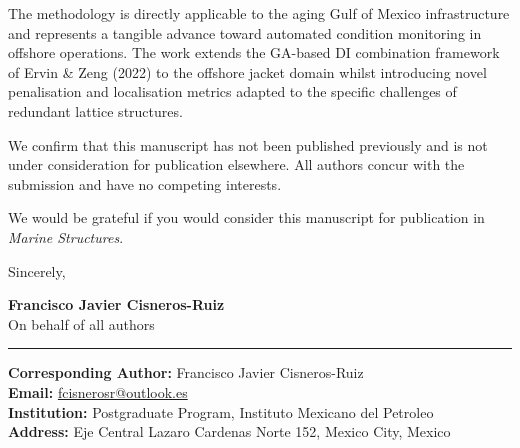 \documentclass[11pt]{article}
\begin{document}
The methodology is directly applicable to the aging Gulf of Mexico infrastructure and represents a tangible advance toward automated condition monitoring in offshore operations. The work extends the GA-based DI combination framework of Ervin \& Zeng (2022) to the offshore jacket domain whilst introducing novel penalisation and localisation metrics adapted to the specific challenges of redundant lattice structures.

We confirm that this manuscript has not been published previously and is not under consideration for publication elsewhere. All authors concur with the submission and have no competing interests.

We would be grateful if you would consider this manuscript for publication in \textit{Marine Structures}.

\vspace{0.5cm}

Sincerely,

\vspace{1.5cm}

\noindent
\textbf{Francisco Javier Cisneros-Ruiz} \\
On behalf of all authors

\vspace{1cm}

\hrule
\vspace{0.3cm}

\noindent
\textbf{Corresponding Author:} Francisco Javier Cisneros-Ruiz \\
\textbf{Email:} \href{mailto:fcisnerosr@outlook.es}{fcisnerosr@outlook.es} \\
\textbf{Institution:} Postgraduate Program, Instituto Mexicano del Petroleo \\
\textbf{Address:} Eje Central Lazaro Cardenas Norte 152, Mexico City, Mexico
\end{document}
